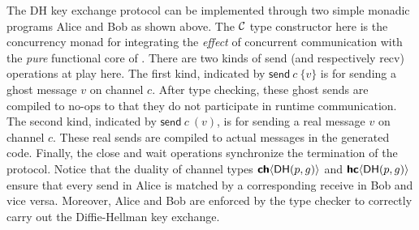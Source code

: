 The \textsf{DH} key exchange protocol can be implemented through two simple monadic
programs \textsf{Alice} and \textsf{Bob} as shown above. The $\mathcal{C}$ type constructor
here is the concurrency monad for integrating the \emph{effect} of concurrent
communication with the \emph{pure} functional core of \TLLC{}. There are two kinds of
\textsf{send} (and respectively \textsf{recv}) operations at play here.
The first kind, indicated by $\textsf{send}\ c\ \{v\}$ is for sending a ghost message
$v$ on channel $c$. After type checking, these ghost sends are compiled to no-ops
to that they do not participate in runtime communication. The second kind, indicated by
$\textsf{send}\ c\ (v)$, is for sending a real message $v$ on channel $c$. These
real sends are compiled to actual messages in the generated code. Finally, the
\textsf{close} and \textsf{wait} operations synchronize the termination of the protocol.
Notice that the duality of channel types ${\textbf{\textsf{ch}}\langle{\textsf{DH}(p,g)}\rangle}$ and ${\textbf{\textsf{hc}}\langle{\textsf{DH}(p,g)}\rangle}$
ensure that every send in \textsf{Alice} is matched by a corresponding receive in
\textsf{Bob} and vice versa. Moreover, \textsf{Alice} and \textsf{Bob} are enforced by the
type checker to correctly carry out the Diffie-Hellman key exchange.

